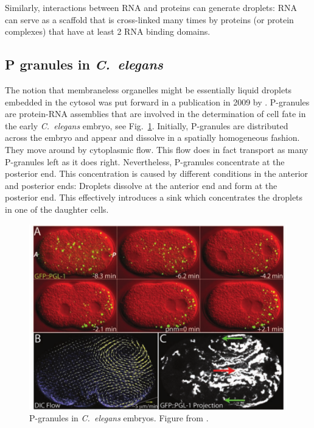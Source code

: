Similarly, interactions between RNA and proteins can generate droplets: RNA can serve as a scaffold that is cross-linked many times by proteins (or protein complexes) that have at least 2 RNA binding domains.

\subsection*{P granules in {\it C.~elegans}}
The notion that membraneless organelles might be essentially liquid droplets embedded in the cytosol was put forward in a publication in 2009 by \citet{brangwynne_germline_2009}.
P-granules are protein-RNA assemblies that are involved in the determination of cell fate in the early {\it C.~elegans} embryo, see Fig.~\ref{fig:pgranules}.
Initially, P-granules are distributed across the embryo and appear and dissolve in a spatially homogeneous fashion.
They move around by cytoplasmic flow.
This flow does in fact transport as many P-granules left as it does right.
Nevertheless, P-granules concentrate at the posterior end.
This concentration is caused by different conditions in the anterior and posterior ends: Droplets dissolve at the anterior end and form at the posterior end.
This effectively introduces a sink which concentrates the droplets in one of the daughter cells.

\begin{figure}[tb]
	\centering
	\includegraphics[width=\textwidth]{figures/Brangwynne_Pgranules_intro.png}
	\caption{P-granules in {\it C.~elegans} embryos. Figure from \citep{brangwynne_germline_2009}.}
	\label{fig:pgranules}
\end{figure}

